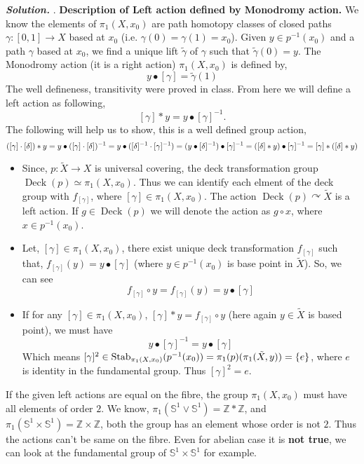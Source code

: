 \documentclass[11pt]{article}
\newcommand{\bb}[1]{\mathbb{#1}}
\newcommand{\Z}{\bb{Z}}
\newcommand{\s}{\bb{S}}
\newcommand{\sol}{ \textbf{\textit{Solution.}} }
\begin{document}
\sol. \textbf{\textsf{Description of Left action defined by Monodromy action.}} We  know the elements of $\pi_1(X,x_0)$ are path homotopy classes of closed paths $\gamma : [0,1] \to X$ based at $x_0$ (i.e. $\gamma(0) = \gamma(1) = x_0$). Given $y \in  p^{-1}(x_0)$ and a path $\gamma$ based at $x_0$, we find a unique lift $\tilde \gamma$ of $\gamma$ such that $\tilde \gamma (0) = y$. The Monodromy action (it is a right action) $\pi_1(X,x_0)$ is defined by, 
$$y\bullet [\gamma]= \tilde{\gamma}(1)$$
The well defineness, transitivity were proved in class. From here we will define a left action as following,
$$[\gamma] * y = y \bullet [\gamma]^{-1} .$$
The following will help us to show, this is a well defined group action, 
$$([\gamma] \cdot [\delta]) * y = y \bullet ([\gamma] \cdot [\delta])^{-1} = y \bullet ([\delta]^{-1} \cdot [\gamma]^{-1}) = (y \bullet [\delta]^{-1}) \bullet [\gamma]^{-1} = ([\delta] * y ) \bullet [\gamma]^{-1} \\= [\gamma] * ([\delta] * y)$$
\begin{itemize}
  \item Since, $p : \tilde{X} \to X$ is universal covering, the deck transformation group $\operatorname{Deck}(p)\simeq \pi_1(X,x_0)$. Thus we can identify each elment of the deck group with $f_{[\gamma]}$, where $[\gamma] \in \pi_1(X,x_0)$. The action $\operatorname{Deck} (p) \curvearrowright \tilde{X}$ is a left action. If $g\in \operatorname{Deck}(p)$ we will denote the action as $g \circ x$, where $x \in p^{-1}(x_0)$.
  \item Let, $[\gamma] \in \pi_1(X,x_0)$, there exist unique deck transformation $f_{[\gamma]}$ such that, $f_{[\gamma]}(y) = y\bullet [\gamma]$ (where $y \in p^{-1}(x_0)$ is base point in $\tilde{X}$). So, we can see $$f_{[\gamma]} \circ y = f_{[\gamma]}(y)= y \bullet [\gamma]$$
  \item If for any $[\gamma] \in \pi_1(X,x_0)$, $[\gamma]\ast y = f_{[\gamma]} \circ y$ (here again $y \in \tilde{X}$ is based point), we must have $$y \bullet [\gamma]^{-1} = y \bullet [\gamma]$$
  Which means $[\gamma]^2 \in \operatorname{Stab}_{\pi_1(X,x_0)}(p^{-1}(x_0)) = \pi_1(p)(\pi_1(\tilde{X},y))= \qty{e}$, where $e$ is identity in the fundamental group. Thus $[\gamma]^2 = e$.
\end{itemize}
If the given left actions are equal on the fibre, the group $\pi_1(X,x_0)$ must have all elements of order $2$. We know, $\pi_1(\s^1\vee \s^1) = \Z \ast \Z$, and $\pi_1(\s^1 \times \s^1) = \Z \times \Z$, both the group has an element whose order is not $2$. Thus the actions can't be same on the fibre. Even for abelian case it is \textbf{\textsf{ not true}}, we can look at the fundamental group of $\s^1 \times \s^1$ for example. 
\end{document}
